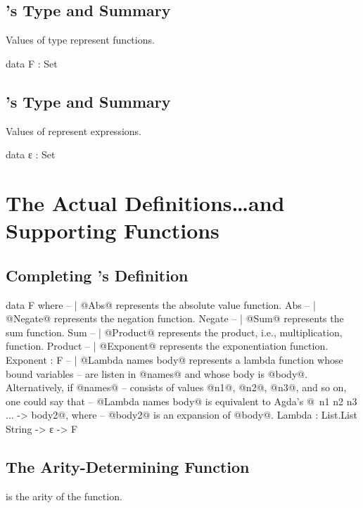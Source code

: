 \documentclass{report}
\begin{document}
\subsection{'s Type and Summary}
Values of type  represent functions.

\begin{code}
data F : Set
\end{code}

\subsection{'s Type and Summary}
Values of  represent expressions.

\begin{code}
data ε : Set
\end{code}

\section{The Actual Definitions\ldots and Supporting Functions}

\subsection{Completing 's Definition}

\begin{code}
data F where
  -- | @Abs@ represents the absolute value function.
  Abs
   -- | @Negate@ represents the negation function.
   Negate
   -- | @Sum@ represents the sum function.
   Sum
   -- | @Product@ represents the product, i.e., multiplication, function.
   Product
   -- | @Exponent@ represents the exponentiation function.
   Exponent : F
  -- | @Lambda names body@ represents a lambda function whose bound variables
  -- are listen in @names@ and whose body is @body@.  Alternatively, if @names@
  -- consists of values @n1@, @n2@, @n3@, and so on, one could say that
  -- @Lambda names body@ is equivalent to Agda's @\ n1 n2 n3 ... -> body2@, where
  -- @body2@ is an expansion of @body@.
  Lambda : List.List String -> ε -> F
\end{code}

\subsection{The Arity-Determining Function}
  is the arity of the  function.
\end{document}
